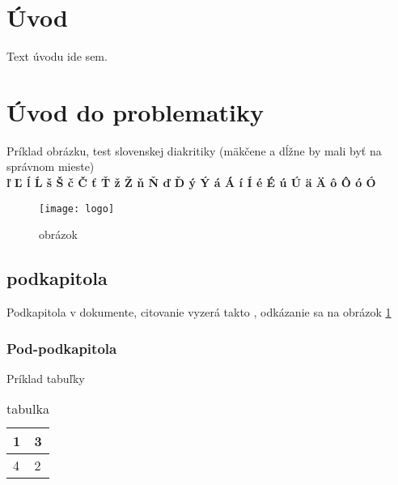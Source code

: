 \documentclass[12pt]{article}
\begin{document}


\newpage %
\thispagestyle{empty}
\tableofcontents
\newpage
\thispagestyle{empty}
\listoffigures
\newpage
\thispagestyle{empty}
\listoftables


\newpage
{}
\setcounter{page}{10} %
\section*{Úvod} %
\hspace{1.25cm}Text úvodu ide sem.

\newpage
\section{Úvod do problematiky}
Príklad obrázku, test slovenskej diakritiky (mäkčene a dĺžne by mali byť na správnom mieste) \\
\textbf{ľ Ľ ĺ Ĺ š Š č Č ť Ť ž Ž ň Ň ď Ď ý Ý á Á í Í é É ú Ú ä Ä ô Ô ó Ó}
\begin{figure}[H] %
\centering
\texttt{[image: logo]}
\caption{obrázok}
\label{img:obrazok}
\end{figure}
\subsection{podkapitola}
Podkapitola v dokumente, citovanie vyzerá takto \cite{modernrob}, odkázanie sa na obrázok \ref{img:obrazok}
\subsubsection{Pod-podkapitola}
Príklad tabuľky
\begin{table}[H]
	\centering
	\caption{tabulka}
	\label{tab:my-table}
	\begin{tabular}{|l|l|}
		\hline
		1 & 3 \\ \hline
		4 & 2 \\ \hline
	\end{tabular}
\end{table}
\end{document}
